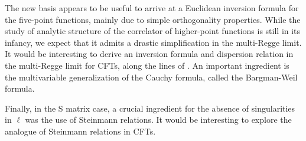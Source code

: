 The new basis appears to be useful to arrive at a Euclidean inversion formula for the five-point functions, mainly due to simple orthogonality properties.
While the study of analytic structure of the correlator of higher-point functions is still in its infancy, we expect that it admits a drastic simplification in the multi-Regge limit.
It would be interesting to derive an inversion formula and dispersion relation in the multi-Regge limit for CFTs, along the lines of \cite{NotesOnMultiRegge}.
An important ingredient is the multivariable generalization of the Cauchy formula, called the Bargman-Weil formula.

Finally, in the S matrix case, a crucial ingredient for the absence of singularities in $ \ell $ was the use of Steinmann relations.
It would be interesting to explore the analogue of Steinmann relations in CFTs.
